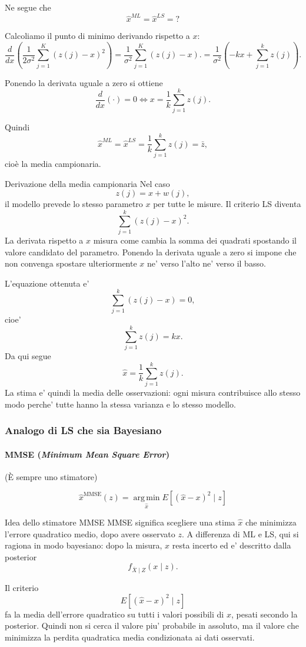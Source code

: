 \documentclass[11pt,a4paper]{article}
\begin{document}
Ne segue che
\[
\hat x^{ML}=\hat x^{LS}=?
\]

Calcoliamo il punto di minimo derivando rispetto a \(x\):
\[
\frac{d}{dx}\left(
\frac{1}{2\sigma^2}\sum_{j=1}^{K}(z(j)-x)^2
\right)
=
\frac{1}{\sigma^2}\sum_{j=1}^{K}(z(j)-x).
=
\frac{1}{\sigma^2}
\left(
-kx+\sum_{j=1}^{k}z(j)
\right).
\]

Ponendo la derivata uguale a zero si ottiene
\[
\frac{d}{dx}(\cdot)=0
\iff
x=\frac{1}{k}\sum_{j=1}^{k}z(j).
\]

Quindi
\[
\hat x^{ML}=\hat x^{LS}
=
\frac{1}{k}\sum_{j=1}^{k}z(j)
=
\bar z,
\]
cioè la media campionaria.

\begin{spiegazione}{Derivazione della media campionaria}
Nel caso
\[
z(j)=x+w(j),
\]
il modello prevede lo stesso parametro $x$ per tutte le misure. Il criterio LS diventa
\[
\sum_{j=1}^{k}(z(j)-x)^2.
\]
La derivata rispetto a $x$ misura come cambia la somma dei quadrati spostando il valore candidato del parametro. Ponendo la derivata uguale a zero si impone che non convenga spostare ulteriormente $x$ ne' verso l'alto ne' verso il basso.

L'equazione ottenuta e'
\[
\sum_{j=1}^{k}(z(j)-x)=0,
\]
cioe'
\[
\sum_{j=1}^{k}z(j)=kx.
\]
Da qui segue
\[
\hat x=\frac{1}{k}\sum_{j=1}^{k}z(j).
\]
La stima e' quindi la media delle osservazioni: ogni misura contribuisce allo stesso modo perche' tutte hanno la stessa varianza e lo stesso modello.
\end{spiegazione}

\subsubsection*{Analogo di LS che sia Bayesiano}

\paragraph{MMSE (\emph{Minimum Mean Square Error})}
(È sempre uno stimatore)

\[
\hat x^{\mathrm{MMSE}}(z)
=
\operatorname*{arg\,min}_{\hat x}
E\!\left[(\hat x-x)^2 \mid z\right]
\]

\begin{spiegazione}{Idea dello stimatore MMSE}
MMSE significa scegliere una stima $\hat x$ che minimizza l'errore quadratico medio, dopo avere osservato $z$. A differenza di ML e LS, qui si ragiona in modo bayesiano: dopo la misura, $x$ resta incerto ed e' descritto dalla posterior
\[
f_{\bar X\mid Z}(x\mid z).
\]

Il criterio
\[
E[(\hat x-x)^2\mid z]
\]
fa la media dell'errore quadratico su tutti i valori possibili di $x$, pesati secondo la posterior. Quindi non si cerca il valore piu' probabile in assoluto, ma il valore che minimizza la perdita quadratica media condizionata ai dati osservati.
\end{spiegazione}
\end{document}
